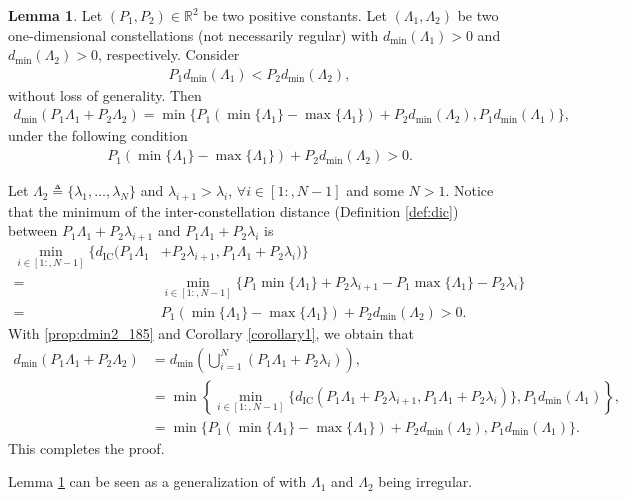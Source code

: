 \documentclass[12pt, draftclsnofoot, onecolumn]{IEEEtran}
\theoremstyle{definition}
\newtheorem{lemma}{Lemma}
\begin{document}
\begin{lemma}\label{prop:dmin2}
Let $(P_1,P_2)\in \mathbb{R}^2$ be two positive constants. Let $(\Lambda_1,\Lambda_2)$ be two one-dimensional constellations (not necessarily regular) with $d_{\min}(\Lambda_1)>0$ and $d_{\min}(\Lambda_2)>0$, respectively. Consider
\begin{align}\label{prop:dmin2_con1}
P_1d_{\min}(\Lambda_1) < P_2d_{\min}(\Lambda_2),
\end{align}
without loss of generality. Then
\begin{align}
d_{\min}(P_1\Lambda_1+P_2\Lambda_2) = \min\{P_1(\min\{\Lambda_1\}-\max\{\Lambda_1\})+P_2d_{\min}(\Lambda_2),P_1d_{\min}(\Lambda_1)\},
\end{align}
under the following condition
\begin{align}\label{prop:dmin2_184}
P_1(\min\{\Lambda_1\}-\max\{\Lambda_1\})+P_2d_{\min}(\Lambda_2) >0.
\end{align}
\end{lemma}
\begin{IEEEproof}
Let $\Lambda_2 \triangleq \{\lambda_1,\ldots,\lambda_{N}\}$ and $\lambda_{i+1}>\lambda_i$, $\forall i \in [1:,N-1]$ and some $N>1$. Notice that the minimum of the inter-constellation distance (Definition \ref{def:dic}) between $P_1\Lambda_1+P_2\lambda_{i+1}$ and $P_1\Lambda_1+P_2\lambda_i$ is
\begin{align}\label{prop:dmin2_185}
\min_{i \in [1:,N-1] }\{d_{\text{IC}}(P_1\Lambda_1&+P_2\lambda_{i+1},P_1\Lambda_1+P_2\lambda_i)\}\nonumber \\
=& \min_{i \in [1:,N-1]}\{P_1\min\{\Lambda_1\}+P_2\lambda_{i+1} - P_1\max\{\Lambda_1\}-P_2\lambda_i\} \nonumber \\
=&
P_1(\min\{\Lambda_1\}-\max\{\Lambda_1\})+P_2d_{\min}(\Lambda_2)>0.
\end{align}
With \eqref{prop:dmin2_185} and Corollary \ref{corollary1}, we obtain that
\begin{align}
d_{\min}(P_1\Lambda_1+P_2\Lambda_2) &= d_{\min}\left(\bigcup_{i=1}^{N}(P_1\Lambda_1+P_2\lambda_i) \right),\nonumber \\
&= \min\left\{\min_{i \in [1:,N-1] }\{d_{\text{IC}}(P_1\Lambda_1+P_2\lambda_{i+1},P_1\Lambda_1+P_2\lambda_i)\},P_1d_{\min}(\Lambda_1)\right\},\nonumber \\
&  = \min\{P_1(\min\{\Lambda_1\}-\max\{\Lambda_1\})+P_2d_{\min}(\Lambda_2),P_1d_{\min}(\Lambda_1)\}.\nonumber
\end{align}
This completes the proof.
\end{IEEEproof}
Lemma \ref{prop:dmin2} can be seen as a generalization of \cite[Prop. 2]{7451210} with $\Lambda_1$ and $\Lambda_2$ being irregular.
\end{document}
